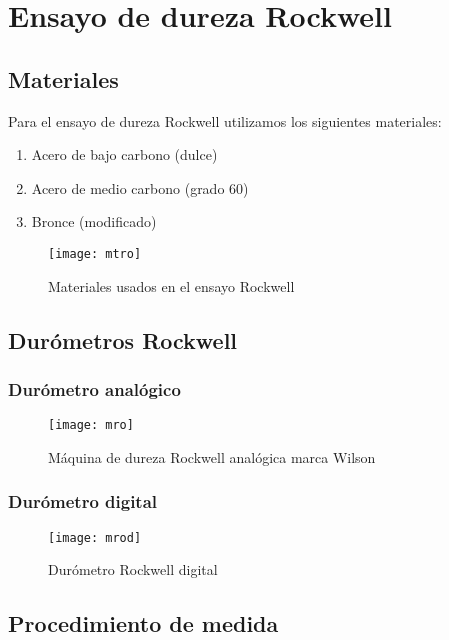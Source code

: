 \documentclass[a4paper,12pt]{report}
\begin{document}
\chapter{Ensayo de dureza Rockwell}
\section{Materiales}
Para el ensayo de dureza Rockwell utilizamos los siguientes materiales:
\begin{enumerate}
\item Acero de bajo carbono (dulce)
\item Acero de medio carbono (grado 60)
\item Bronce (modificado)
\end{enumerate}
\begin{figure}[H]
\begin{center}
\texttt{[image: mtro]}
\caption{Materiales usados en el ensayo Rockwell}
\end{center}
\end{figure}
\section{Durómetros Rockwell}
\subsection{Durómetro analógico}
\begin{figure}[H]
\begin{center}
\texttt{[image: mro]}
\caption[Durómetro Rockwell analógico]{Máquina de dureza Rockwell analógica marca Wilson}
\end{center}
\end{figure}
\subsection{Durómetro digital}
\begin{figure}[H]
\begin{center}
\texttt{[image: mrod]}
\caption{Durómetro Rockwell digital}
\end{center}
\end{figure}
\section{Procedimiento de medida}
\end{document}
